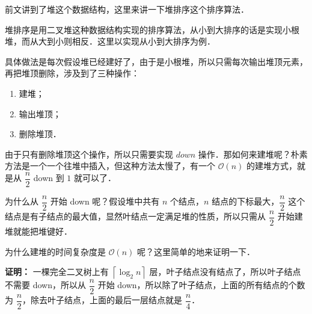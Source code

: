 
前文讲到了堆这个数据结构，这里来讲一下堆排序这个排序算法．

堆排序是用二叉堆这种数据结构实现的排序算法，从小到大排序的话是实现小根堆，而从大到小则相反．这里以实现从小到大排序为例．

具体做法是每次假设堆已经建好了，由于是小根堆，所以只需每次输出堆顶元素，再把堆顶删除，涉及到了三种操作：

\begin{enumerate}
\item 建堆；
\item 输出堆顶；
\item 删除堆顶．
\end{enumerate}

由于只有删除堆顶这个操作，所以只需要实现 $down$ 操作．那如何来建堆呢？朴素方法是一个一个往堆中插入，但这种方法太慢了，有一个 $\mathcal{O}(n)$ 的建堆方式，就是从 $\dfrac{n}{2}$ down 到 $1$ 就可以了． 

为什么从 $\dfrac{n}{2}$ 开始 down 呢？假设堆中共有 $n$ 个结点，$n$ 结点的下标最大，$\dfrac{n}{2}$ 这个结点是有子结点的最大值，显然叶结点一定满足堆的性质，所以只需从 $\dfrac{n}{2}$ 开始建堆就能把堆键好．

为什么建堆的时间复杂度是 $\mathcal{O}(n)$ 呢？这里简单的地来证明一下．

\textbf{证明：}
一棵完全二叉树上有 $\left\lceil{\log_2 n}\right\rceil$ 层，叶子结点没有结点了，所以叶子结点不需要 down，所以从 $\dfrac{n}{2}$ 开始 down，所以除了叶子结点，上面的所有结点的个数为 $\dfrac{n}{2}$，除去叶子结点，上面的最后一层结点就是 $\dfrac{n}{4}$．
